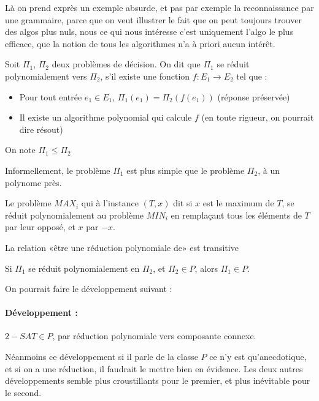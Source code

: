 \begin{com}
	Là on prend exprès un exemple absurde, et pas par exemple la reconnaissance par une grammaire, parce que on veut illustrer le fait que on peut toujours trouver des algos plus nuls, nous ce qui nous intéresse c'est uniquement l'algo le plus efficace, que la notion de tous les algorithmes n'a à priori aucun intérêt.
\end{com}

\begin{definition}
	Soit $\Pi_1$, $\Pi_2$ deux problèmes de décision. On dit que $\Pi_1$ se réduit polynomialement vers $\Pi_2$, s'il existe une fonction $f : E_1 \to E_2$ tel que : \begin{itemize}
		\item Pour tout entrée $e_1 \in E_1$, $\Pi_1(e_1) = \Pi_2(f(e_1))$ (réponse préservée)
		\item Il existe un algorithme polynomial qui calcule $f$ (en toute rigueur, on pourrait dire résout)
	\end{itemize}
	On note $\Pi_1 \leq \Pi_2$
\end{definition}

\begin{idee}
	Informellement, le problème $\Pi_1$ est plus simple que le problème $\Pi_2$, à un polynome près.
\end{idee}

\begin{example}
	Le problème $MAX_i$ qui à l'instance $(T, x)$ dit si $x$ est le maximum de $T$, se réduit polynomialement au problème $MIN_i$ en remplaçant tous les éléments de $T$ par leur opposé, et $x$ par $-x$.
\end{example}

\begin{proposition}
	La relation «être une réduction polynomiale de» est transitive
\end{proposition}

\begin{proposition}
	 Si $\Pi_1$ se réduit polynomialement en $\Pi_2$, et $\Pi_2 \in P$, alors $\Pi_1 \in P$.
\end{proposition}

\begin{com}
	On pourrait faire le développement suivant :
\paragraph{Développement :} $2-SAT \in P$, par réduction polynomiale vers composante connexe.

	Néanmoins ce développement si il parle de la classe $P$ ce n'y est qu'anecdotique, et si on a une réduction, il faudrait le mettre bien en évidence. Les deux autres développements semble plus croustillants pour le premier, et plus inévitable pour le second.
\end{com}
